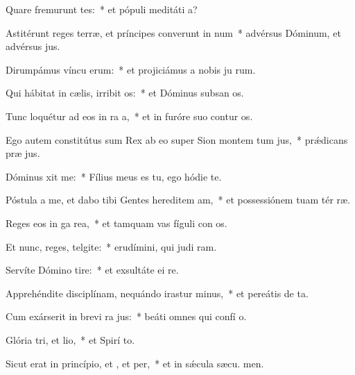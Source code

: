 \item Quare fremurunt tes:~* et pópuli meditáti  a?
\item Astitérunt reges terræ, et príncipes converunt in num~* advérsus Dóminum, et advérsus  jus.
\item Dirumpámus víncu erum:~* et projiciámus a nobis ju rum.
\item Qui hábitat in cælis, irribit os:~* et Dóminus subsan os.
\item Tunc loquétur ad eos in ra a,~* et in furóre suo contur os.
\item Ego autem constitútus sum Rex ab eo super Sion montem tum jus,~* prǽdicans præ jus.
\item Dóminus xit  me:~* Fílius meus es tu, ego hódie  te.
\item Póstula a me, et dabo tibi Gentes hereditem am,~* et possessiónem tuam tér ræ.
\item Reges eos in ga rea,~* et tamquam vas fíguli con os.
\item Et nunc, reges, telgite:~* erudímini, qui judi ram.
\item Servíte Dómino  tire:~* et exsultáte ei  re.
\item Apprehéndite disciplínam, nequándo irastur minus,~* et pereátis de  ta.
\item Cum exárserit in brevi ra jus:~* beáti omnes qui confí  o.
\item Glória tri, et lio,~* et Spirí to.
\item Sicut erat in princípio, et , et per,~* et in sǽcula sæcu. men.
